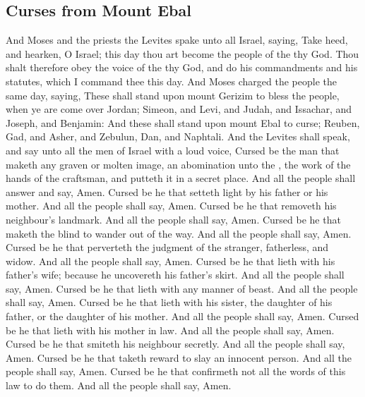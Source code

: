\begin{biblechapter}
\section*{Curses from Mount Ebal}
\verse And Moses and the priests the Levites spake unto all Israel, saying, Take heed, and hearken, O Israel; this day thou art become the people of the \LORD thy God.
\verse Thou shalt therefore obey the voice of the \LORD thy God, and do his commandments and his statutes, which I command thee this day.
\verse And Moses charged the people the same day, saying,
\verse These shall stand upon mount Gerizim to bless the people, when ye are come over Jordan; Simeon, and Levi, and Judah, and Issachar, and Joseph, and Benjamin:
\verse And these shall stand upon mount Ebal to curse; Reuben, Gad, and Asher, and Zebulun, Dan, and Naphtali.
\verse And the Levites shall speak, and say unto all the men of Israel with a loud voice,
\verse Cursed be the man that maketh any graven or molten image, an abomination unto the \LORD, the work of the hands of the craftsman, and putteth it in a secret place. And all the people shall answer and say, Amen.
\verse Cursed be he that setteth light by his father or his mother. And all the people shall say, Amen.
\verse Cursed be he that removeth his neighbour's landmark. And all the people shall say, Amen.
\verse Cursed be he that maketh the blind to wander out of the way. And all the people shall say, Amen.
\verse Cursed be he that perverteth the judgment of the stranger, fatherless, and widow. And all the people shall say, Amen.
\verse Cursed be he that lieth with his father's wife; because he uncovereth his father's skirt. And all the people shall say, Amen.
\verse Cursed be he that lieth with any manner of beast. And all the people shall say, Amen.
\verse Cursed be he that lieth with his sister, the daughter of his father, or the daughter of his mother. And all the people shall say, Amen.
\verse Cursed be he that lieth with his mother in law. And all the people shall say, Amen.
\verse Cursed be he that smiteth his neighbour secretly. And all the people shall say, Amen.
\verse Cursed be he that taketh reward to slay an innocent person. And all the people shall say, Amen.
\verse Cursed be he that confirmeth not all the words of this law to do them. And all the people shall say, Amen.
\end{biblechapter}

